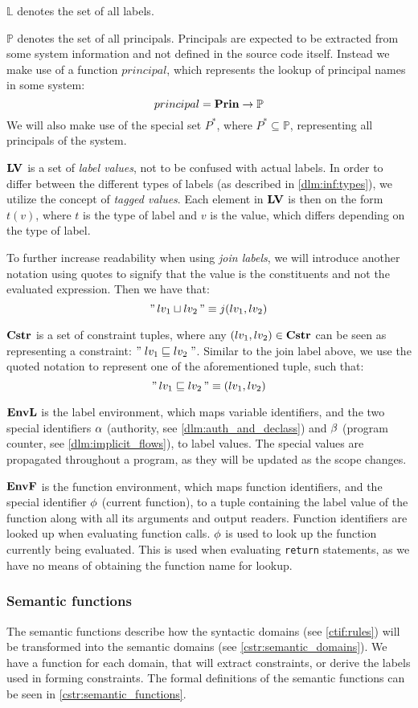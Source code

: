 $\mathbb L$ denotes the set of all labels.

$\mathbb P$ denotes the set of all principals.
Principals are expected to be extracted from some system information and not defined in the source code itself.
Instead we make use of a function $principal$, which represents the lookup of principal names in some system:
\[ principal = \mathbf{Prin} \rightarrow \mathbb P \]
We will also make use of the special set $P^*$, where $P^* \subseteq \mathbb{P}$, representing all principals of the system.

$\mathbf{LV}$ is a set of \emph{label values}, not to be confused with actual labels.
In order to differ between the different types of labels (as described in \cref{dlm:inf:types}), we utilize the concept of \emph{tagged values}.
Each element in $\mathbf{LV}$ is then on the form $t(v)$, where $t$ is the type of label and $v$ is the value, which differs depending on the type of label.

To further increase readability when using \emph{join labels}, we will introduce another notation using quotes to signify that the value is the constituents and not the evaluated expression.
Then we have that:
\[ "\,lv_1 \sqcup lv_2\," \equiv j(lv_1, lv_2) \]

$\mathbf{Cstr}$ is a set of constraint tuples, where any $(lv_1, lv_2) \in \mathbf{Cstr}$ can be seen as representing a constraint: $" \; lv_1 \sqsubseteq lv_2 \; "$.
Similar to the join label above, we use the quoted notation to represent one of the aforementioned tuple, such that:
\[ "\,lv_1 \sqsubseteq lv_2\," \equiv (lv_1, lv_2) \]

$\mathbf{EnvL}$ is the label environment, which maps variable identifiers, and the two special identifiers $\alpha$ (authority, see \cref{dlm:auth_and_declass}) and $\beta$ (program counter, see \cref{dlm:implicit_flows}), to label values.
The special values are propagated throughout a program, as they will be updated as the scope changes.

$\mathbf{EnvF}$ is the function environment, which maps function identifiers, and the special identifier $\phi$ (current function), to a tuple containing the label value of the function along with all its arguments and output readers.
Function identifiers are looked up when evaluating function calls.
$\phi$ is used to look up the function currently being evaluated.
This is used when evaluating \texttt{return} statements, as we have no means of obtaining the function name for lookup.

\subsubsection{Semantic functions}
The semantic functions describe how the syntactic domains (see \cref{ctif:rules}) will be transformed into the semantic domains (see \cref{cstr:semantic_domains}).
We have a function for each domain, that will extract constraints, or derive the labels used in forming constraints.
The formal definitions of the semantic functions can be seen in \cref{cstr:semantic_functions}.

